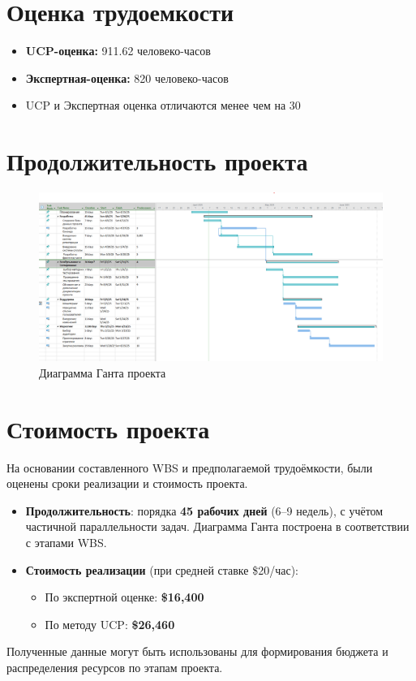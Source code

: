 \documentclass[14pt, russian]{matmex-diploma-custom}
\begin{document}
\section{Оценка трудоемкости}
\begin{itemize}
    \item \textbf{UCP-оценка:} 911.62 человеко-часов
    \item \textbf{Экспертная-оценка:} 820 человеко-часов
    \item UCP и Экспертная оценка отличаются менее чем на 30
\end{itemize}

\section{Продолжительность проекта}
\begin{figure}[h!]
    \centering
    \includegraphics[width=\textwidth]{gant.png}
    \caption{Диаграмма Ганта проекта}
    \label{fig:gantt}
  \end{figure}

\section{Стоимость проекта}
На основании составленного WBS и предполагаемой трудоёмкости, были оценены сроки реализации и стоимость проекта.

\begin{itemize}
    \item \textbf{Продолжительность}: порядка \textbf{45 рабочих дней} (6–9 недель), с учётом частичной параллельности задач. Диаграмма Ганта построена в соответствии с этапами WBS.
    \item \textbf{Стоимость реализации} (при средней ставке \$20/час):
    \begin{itemize}
        \item По экспертной оценке: \textbf{\$16,400}
        \item По методу UCP: \textbf{\$26,460}
    \end{itemize}
\end{itemize}

Полученные данные могут быть использованы для формирования бюджета и распределения ресурсов по этапам проекта.
\end{document}
